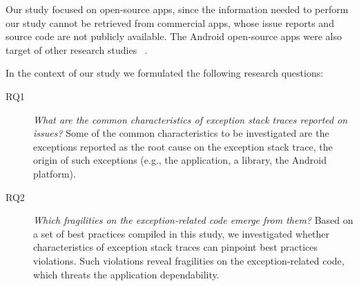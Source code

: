 \documentclass[conference]{IEEEtran}
\begin{document}
Our study focused on open-source apps, since the information needed to perform our study
cannot be retrieved from commercial apps, whose issue reports and 
source code are not publicly available. The Android open-source apps were also 
target of other research studies ~\cite{Linar13,ahimed}.   


In the context of our study we formulated the following research questions:

\begin{description}

  \item[RQ1] \noindent\emph{What are the common characteristics of exception stack traces reported on issues?} 
Some of the common characteristics to be investigated are the exceptions reported as the root cause on
the exception stack trace, the origin of such exceptions (e.g., the application, a library, the Android platform). 


  \item[RQ2] \noindent\emph{Which fragilities on the exception-related code emerge from them?}
Based on a set of best practices compiled in this study, we investigated whether characteristics of exception stack traces  
can pinpoint best practices violations. Such  violations reveal fragilities
on the exception-related code, which threats the application dependability.

\end{description}

\end{document}
